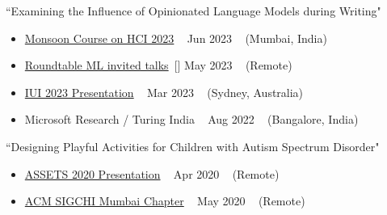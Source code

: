 \begin{talks}
    \talk
    {``Examining the Influence of Opinionated Language Models during Writing"}
    {
        \begin{itemize}[leftmargin=.4in]
            \item \href{https://www.idc.iitb.ac.in/~anirudha/monsoon/2023.html}{Monsoon Course on HCI 2023} ~ \hfill Jun 2023 ~ (Mumbai, India)
            \item \href{https://www.roundtableml.com/}{Roundtable ML invited talks}~[\href{https://www.youtube.com/watch?v=zXt6WnFwkV0}{\small{\videoSymbol}}] \hfill May 2023 ~ (Remote)
            \item \href{https://iui.acm.org/2023/}{IUI 2023 Presentation} ~ \hfill Mar 2023 ~ (Sydney, Australia)
            \item Microsoft Research / Turing India ~ \hfill Aug 2022 ~ (Bangalore, India)
        \end{itemize}
    }
    \talk
    {``Designing Playful Activities for Children with Autism Spectrum Disorder"}
    {
        \begin{itemize}[leftmargin=.4in]
            \item \href{https://assets20.sigaccess.org/accepted_posters.html\#tuesday_posters}{ASSETS 2020 Presentation} ~ \hfill Apr 2020 ~ (Remote)
            \item \href{https://sigchimumbai.acm.org/wp/}{ACM SIGCHI Mumbai Chapter} ~ \hfill May 2020 ~ (Remote)
        \end{itemize}
    }
\end{talks}
\vspace{-3mm}
